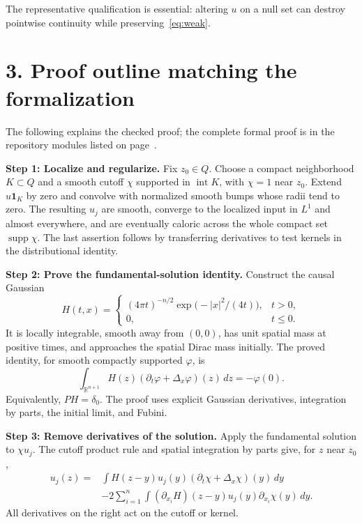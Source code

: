 \documentclass[11pt,letterpaper]{article}
\newcommand{\R}{\mathbb R}
\begin{document}
The representative qualification is essential: altering $u$ on a null set
can destroy pointwise continuity while preserving~\eqref{eq:weak}.

\newpage
\section*{3. Proof outline matching the formalization}
The following explains the checked proof; the complete formal proof is in the
repository modules listed on page~\pageref{sec:verification}.

\textbf{Step 1: Localize and regularize.}
Fix $z_0\in Q$. Choose a compact neighborhood $K\subset Q$ and a smooth
cutoff $\chi$ supported in $\operatorname{int}K$, with $\chi=1$ near $z_0$.
Extend $u\mathbf1_K$ by zero and convolve with normalized smooth bumps whose
radii tend to zero. The resulting $u_j$ are smooth, converge to the localized
input in $L^1$ and almost everywhere, and are eventually caloric across the
whole compact set $\operatorname{supp}\chi$. The last assertion follows by
transferring derivatives to test kernels in the distributional identity.

\textbf{Step 2: Prove the fundamental-solution identity.}
Construct the causal Gaussian
\[
 H(t,x)=\begin{cases}
 (4\pi t)^{-n/2}\exp\!\bigl(-|x|^2/(4t)\bigr),&t>0,\\
 0,&t\leq0.
 \end{cases}
\]
It is locally integrable, smooth away from $(0,0)$, has unit spatial mass
at positive times, and approaches the spatial Dirac mass initially. The proved
identity, for smooth compactly supported $\varphi$, is
\[
  \int_{\R^{n+1}} H(z)(\partial_t\varphi+\Delta_x\varphi)(z)\,dz
  =-\varphi(0).
\]
Equivalently, $PH=\delta_0$. The proof uses explicit Gaussian derivatives,
integration by parts, the initial limit, and Fubini.

\textbf{Step 3: Remove derivatives of the solution.}
Apply the fundamental solution to $\chi u_j$. The cutoff product rule and
spatial integration by parts give, for $z$ near $z_0$,
\begin{align*}
 u_j(z)={}&\int H(z-y)u_j(y)
                   (\partial_t\chi+\Delta_x\chi)(y)\,dy\\
 &-2\sum_{i=1}^n\int(\partial_{x_i}H)(z-y)u_j(y)
                                      \partial_{x_i}\chi(y)\,dy.
\end{align*}
All derivatives on the right act on the cutoff or kernel.
\end{document}
